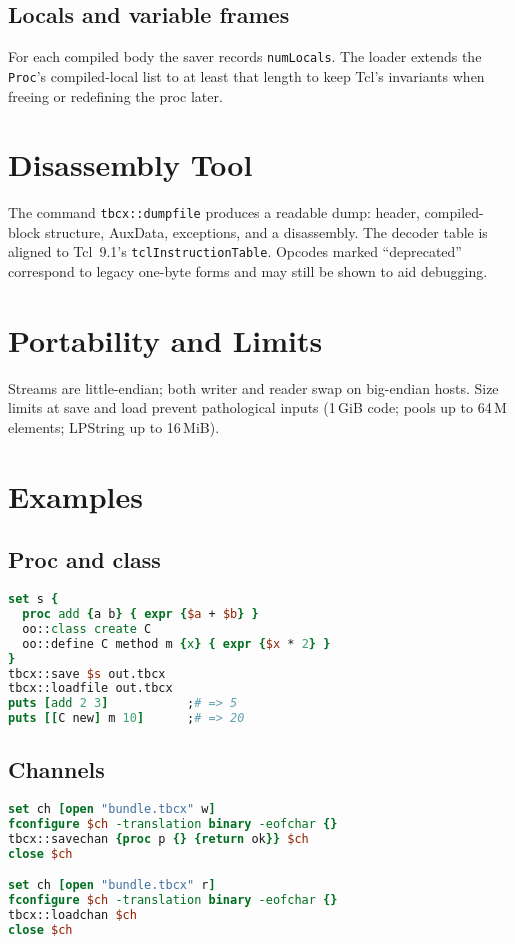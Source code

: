 \documentclass[11pt,a4paper]{article}
\begin{document}
\subsection{Locals and variable frames}
For each compiled body the saver records \texttt{numLocals}. The loader extends the \texttt{Proc}'s compiled-local
list to at least that length to keep Tcl's invariants when freeing or redefining the proc later.

\section{Disassembly Tool}
The command \texttt{tbcx::dumpfile} produces a readable dump: header, compiled-block structure,
AuxData, exceptions, and a disassembly. The decoder table is aligned to Tcl~9.1's
\texttt{tclInstructionTable}. Opcodes marked ``deprecated'' correspond to legacy one-byte forms and may
still be shown to aid debugging.

\section{Portability and Limits}
Streams are little-endian; both writer and reader swap on big-endian hosts. Size limits at save and load
prevent pathological inputs (1\,GiB code; pools up to 64\,M elements; LPString up to 16\,MiB).

\section{Examples}
\subsection{Proc and class}
\begin{lstlisting}[language=Tcl]
set s {
  proc add {a b} { expr {$a + $b} }
  oo::class create C
  oo::define C method m {x} { expr {$x * 2} }
}
tbcx::save $s out.tbcx
tbcx::loadfile out.tbcx
puts [add 2 3]           ;# => 5
puts [[C new] m 10]      ;# => 20
\end{lstlisting}

\subsection{Channels}
\begin{lstlisting}[language=Tcl]
set ch [open "bundle.tbcx" w]
fconfigure $ch -translation binary -eofchar {}
tbcx::savechan {proc p {} {return ok}} $ch
close $ch

set ch [open "bundle.tbcx" r]
fconfigure $ch -translation binary -eofchar {}
tbcx::loadchan $ch
close $ch
\end{lstlisting}
\end{document}
